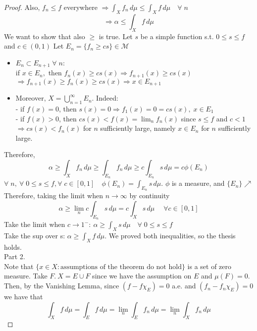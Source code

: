 \begin{proof}
    Also, \(f_n \leq f \) everywhere \(\Rightarrow \int_X f_n \, d\mu \leq \int_X f \, d\mu \quad \forall \; n\) 
    \[
        \Rightarrow \alpha \leq \int_X f \, d\mu 
    \]
    We want to show that also \(\geq \) is true. Let \(s\) be a simple function s.t. \(0 \leq s \leq f\) and \(c \in \left(0,1\right)\)
    Let \(E_n = \{f_n \geq cs\} \in \mathcal{M}\)
    \begin{itemize}
        \item \(E_n \subset E_{n+1} \; \forall \; n:\) 
        \\ if \(x \in E_n, \) then \(f_n(x) \geq cs(x) \Rightarrow f_{n+1}(x) \geq cs(x)\) \\ \(\Rightarrow f_{n+1}(x) \geq f_n(x) \geq cs(x) \Rightarrow x \in E_{n+1}\)
        \item Moreover, \(X = \bigcup_{n=1}^\infty E_n\). Indeed: 
        \\ - if \(f(x)=0\), then \(s(x)=0 \Rightarrow f_1(x)=0 = cs(x), \; x \in E_1\) 
        \\ - if \(f(x)>0\), then \(cs(x) < f(x)=\lim_n f_n(x)\) since \(s \leq f \) and \(c <1\) 
        \\ \(\Rightarrow cs(x) < f_n(x)\) for \(n \) sufficiently large, namely \(x \in E_n \) for \(n \) sufficiently large. 
    \end{itemize} 
    Therefore, 
    \[
        \alpha \geq \int_X f_n \, d\mu \geq \int_{E_n} f_n \, d\mu \geq c \int_{E_n} s \, d\mu = c \phi(E_n)
    \]
    \(\forall \; n, \ \forall \; 0 \leq s \leq f, \forall \; c \in \left[0, 1\right]\quad \phi(E_n) = \int_{E_n} s \, d\mu\). 
    \(\phi\) is a measure, and \(\{E_n\} \nearrow\) \\
    Therefore, taking the limit when \(n \to \infty\) by continuity 
    \[
        \alpha \geq \lim_n c \int_{E_n} s \, d\mu = c \int_X s \, d\mu \; \quad \forall c \in \left[0, 1\right]
    \]
    Take the limit when \(c \to 1^-: \ \alpha \geq \int_X s \, d\mu  \quad \forall \; 0 \leq s \leq f \) \\
    Take the sup over s: \(\alpha \geq \int_X f \, d\mu \).
    We proved both inequalities, so the thesis holds. \\
    Part 2. \\
    Note that \(\{x \in X: \text{assumptions of the theorem do not hold}\}\) is a set of zero measure. Take \(F. \ X = E \cup F \) since we have the assumption on \(E\) and \(\mu (F)=0\). \\ 
    Then, by the Vanishing Lemma, since \((f - f \chi_E)=0\) a.e. and \((f_n - f_n \chi_E)=0\) we have that 
    \[ 
        \int_X f \, d\mu = \int_E f \, d\mu = \lim_n \int_E f_n \, d\mu = \lim_n \int_X f_n \, d\mu 
    \]
\end{proof}

